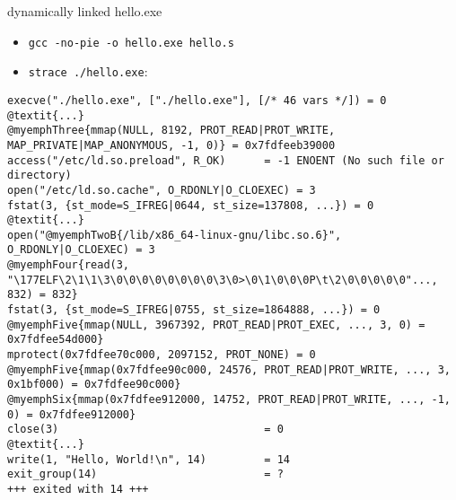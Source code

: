 
\begin{frame}[fragile,label=straceDynamic]{dynamically linked hello.exe}
\begin{itemize}
\item \small{\tt gcc -no-pie -o hello.exe hello.s}
\item \small{\tt strace ./hello.exe}:
\end{itemize}
\begin{Verbatim}[commandchars=@\{\},fontsize=\fontsize{8}{9}\selectfont]
execve("./hello.exe", ["./hello.exe"], [/* 46 vars */]) = 0
@textit{...}
@myemphThree{mmap(NULL, 8192, PROT_READ|PROT_WRITE, MAP_PRIVATE|MAP_ANONYMOUS, -1, 0)} = 0x7fdfeeb39000
access("/etc/ld.so.preload", R_OK)      = -1 ENOENT (No such file or directory)
open("/etc/ld.so.cache", O_RDONLY|O_CLOEXEC) = 3
fstat(3, {st_mode=S_IFREG|0644, st_size=137808, ...}) = 0
@textit{...}
open("@myemphTwoB{/lib/x86_64-linux-gnu/libc.so.6}", O_RDONLY|O_CLOEXEC) = 3
@myemphFour{read(3, "\177ELF\2\1\1\3\0\0\0\0\0\0\0\0\3\0>\0\1\0\0\0P\t\2\0\0\0\0\0"..., 832) = 832}
fstat(3, {st_mode=S_IFREG|0755, st_size=1864888, ...}) = 0
@myemphFive{mmap(NULL, 3967392, PROT_READ|PROT_EXEC, ..., 3, 0) = 0x7fdfee54d000}
mprotect(0x7fdfee70c000, 2097152, PROT_NONE) = 0
@myemphFive{mmap(0x7fdfee90c000, 24576, PROT_READ|PROT_WRITE, ..., 3, 0x1bf000) = 0x7fdfee90c000}
@myemphSix{mmap(0x7fdfee912000, 14752, PROT_READ|PROT_WRITE, ..., -1, 0) = 0x7fdfee912000}
close(3)                                = 0
@textit{...}
write(1, "Hello, World!\n", 14)         = 14
exit_group(14)                          = ?
+++ exited with 14 +++
\end{Verbatim}
\end{frame}

